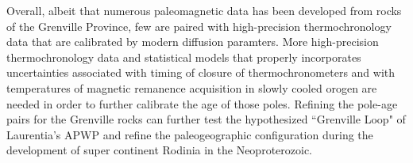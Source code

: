 \documentclass[draft]{agujournal2019}
\begin{document}
Overall, albeit that numerous paleomagnetic data has been developed from rocks of the Grenville Province, few are paired with high-precision thermochronology data that are calibrated by modern diffusion paramters. More high-precision thermochronology data and statistical models that properly incorporates uncertainties associated with timing of closure of thermochronometers and with temperatures of magnetic remanence acquisition in slowly cooled orogen are needed in order to further calibrate the age of those poles. Refining the pole-age pairs for the Grenville rocks can further test the hypothesized ``Grenville Loop" of Laurentia's APWP \cite{Irving1974a} and refine the paleogeographic configuration during the development of super continent Rodinia in the Neoproterozoic.  





\end{document}

